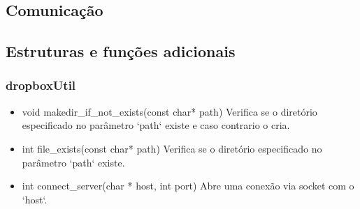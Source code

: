 \documentclass[a4paper]{article}
\begin{document}
\subsection{Comunicação}

\subsection{Estruturas e funções adicionais}

\subsubsection{dropboxUtil}
\begin{itemize}
	\item void makedir\_if\_not\_exists(const char* path)
	\newline Verifica se o diretório especificado no parâmetro `path` existe e caso contrario o cria.
	
	\item int file\_exists(const char* path)
	\newline Verifica se o diretório especificado no parâmetro `path` existe.

	\item int connect\_server(char * host, int port)
	\newline Abre uma conexão via socket com o `host`.
\end{itemize}
\end{document}

